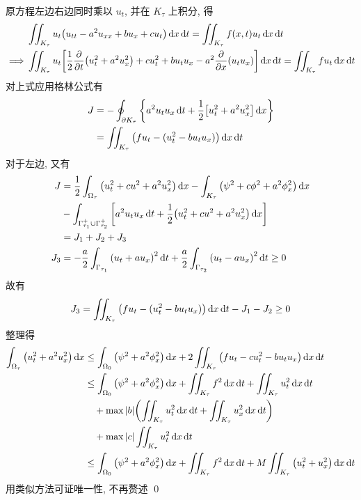\solution
原方程左边右边同时乘以 $u_t$, 并在 $K_\tau$ 上积分, 得
\[ \begin{aligned}
& \iint_{K_\tau} u_t \mclosure{
	u_{tt} - a^2 u_{xx} + b u_x + c u_t
} \diff x \diff t = \iint_{K_\tau} f(x, t) u_t \diff x \diff t \\
\implies & \iint_{K_\tau} u_t \mclosuresquare{
	\frac12 \fracpartials{t} \mclosure{u_t^2 + a^2 u_x^2}
	+ c u_t^2 + b u_t u_x - a^2 \fracpartials{x} \mclosure{u_t u_x}
} \diff x \diff t = \iint_{K_\tau} f u_t \diff x \diff t
\end{aligned} \]
对上式应用格林公式有
\[ \begin{aligned}
J &= -\oint_{\partial K_\tau} {\left\{ {
	a^2 u_t u_x \operatorname{d\!} t + \frac12 {\left[ { u_t^2 + a^2 u_x^2 } \right]} \operatorname{d\!} x
} \right\}} \\
&= \iint_{K_\tau} {\left( { f u_t - (u_t^2 - b u_t u_x) } \right)} \operatorname{d\!} x \operatorname{d\!} t
\end{aligned} \]
对于左边, 又有
\[ \begin{aligned}
J &= \frac12 \int_{\Omega_\tau} {\left( {u_t^2 + cu^2 + a^2 u_x^2} \right)} \operatorname{d\!} x
- \int_{K_\tau} {\left( {\psi^2 + c\phi^2 + a^2 \phi_x^2} \right)} \operatorname{d\!} x \\
&- \int_{\Gamma_{\tau_1}^{+}\cup\Gamma_{\tau_2}^{+}} {\left[ {
	a^2 u_t u_x \operatorname{d\!} t + \frac12 {\left( {
		u_t^2 + c u^2 + a^2 u_x^2
	} \right)} \operatorname{d\!} x
} \right]} \\
&= J_1 + J_2 + J_3 \\
J_3 &= -\frac{a}{2} \int_{\Gamma_{\tau_1}} {\left( {
	u_t + a u_x
} \right)}^2 \operatorname{d\!} t + \frac{a}{2} \int_{\Gamma_{\tau_2}} {\left( {
	u_t - a u_x
} \right)}^2 \operatorname{d\!} t \geq 0
\end{aligned} \]
故有
\[
J_3 = \iint_{K_\tau} {\left( {
	f u_t - (u_t^2 - b u_t u_x)
} \right)} \operatorname{d\!} x \operatorname{d\!} t - J_1 - J_2 \geq 0
\]
整理得
\[ \begin{aligned}
\int_{\Omega_\tau} \mclosure{ u_t^2 + a^2 u_x^2 } \diff x
& \leq \int_{\Omega_0} \mclosure{ \psi^2 + a^2 \phi_x^2 } \diff x
 +2 \iint_{K_\tau} \mclosure{
	f u_t - c u_t^2 - b u_t u_x
} \diff x \diff t \\
&\leq \int_{\Omega_0} \mclosure{ \psi^2 + a^2 \phi_x^2 } \diff x
 +\iint_{K_\tau} f^2\diff x\diff t +\iint_{K_\tau} u_t^2\diff x\diff t \\
&\quad+ \max\abs{b} \mclosure{
	\iint_{K_\tau} u_t^2 \diff x \diff t + \iint_{K_\tau} u_x^2 \diff x \diff t
} \\
&\quad+ \max\abs{c} \iint_{K_\tau} u_t^2 \diff x \diff t \\
&\leq \int_{\Omega_0} \mclosure{ \psi^2 + a^2 \phi_x^2 } \diff x
+\iint_{K_\tau} f^2\diff x\diff t + M \iint_{K_\tau} \mclosure{
	u_t^2 + u_x^2
} \diff x \diff t
\end{aligned} \]
用类似方法可证唯一性, 不再赘述
\qed

